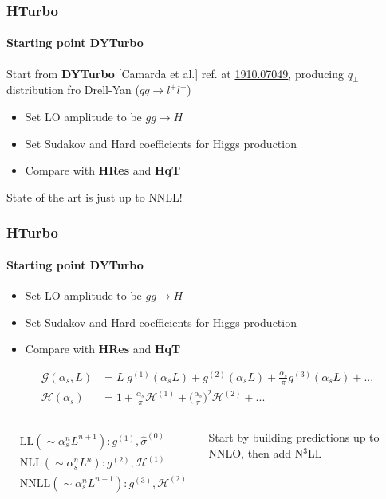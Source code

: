 \documentclass[aspectratio=43]{beamer}
\begin{document}
\begin{frame}

\frametitle{HTurbo}
\framesubtitle{Starting point DYTurbo}
	
	Start from \textbf{DYTurbo} [Camarda et al.] ref. at {\color{blue} \href{https://arxiv.org/abs/1910.07049}{1910.07049}}, producing $q_{\perp}$ distribution fro Drell-Yan ($q\bar{q} \rightarrow l^{+}l^{-}$)
	
	\begin{itemize}
		\item Set LO amplitude to be $gg \rightarrow H$
		\item Set Sudakov and Hard coefficients for Higgs production
		\item Compare with \textbf{HRes} and \textbf{HqT}
	\end{itemize}

	\vspace{0.5 cm}

	{\color{red} State of the art is just up to NNLL!}

\end{frame}

\begin{frame}

	\frametitle{HTurbo}
	\framesubtitle{Starting point DYTurbo}
	
	\begin{itemize}
		\item Set LO amplitude to be $gg \rightarrow H$
		\item Set Sudakov and Hard coefficients for Higgs production
		\item Compare with \textbf{HRes} and \textbf{HqT}
	\end{itemize}
	
	\begin{align}
		\mathcal{G}(\alpha_{s}, L) &= L\;g^{(1)}(\alpha_{s}L) + g^{(2)}(\alpha_{s}L) + \frac{\alpha_{s}}{\pi}g^{(3)}(\alpha_{s}L) + ... \nonumber \\
		\mathcal{H}(\alpha_{s}) &= 1 + \frac{\alpha_{s}}{\pi}\mathcal{H}^{(1)} + \Big(\frac{\alpha_{s}}{\pi}\Big)^{2}\mathcal{H}^{(2)} + ...  \nonumber
	\end{align}
	
	\begin{columns}
		

		\begin{align}
			&\textrm{LL} (\sim \alpha_{s}^{n}L^{n+1}): g^{(1)}, \hat{\sigma}^{(0)} \nonumber \\
			&\textrm{NLL} (\sim \alpha_{s}^{n}L^{n}): g^{(2)}, \mathcal{H}^{(1)} \nonumber \\
			&\textrm{NNLL} (\sim \alpha_{s}^{n}L^{n-1}): g^{(3)}, \mathcal{H}^{(2)} \nonumber
		\end{align}
	
		
		Start by building predictions up to NNLO, then add {\color{blue}N$^{3}$LL}
		
	\end{columns}

\end{frame}
\end{document}
